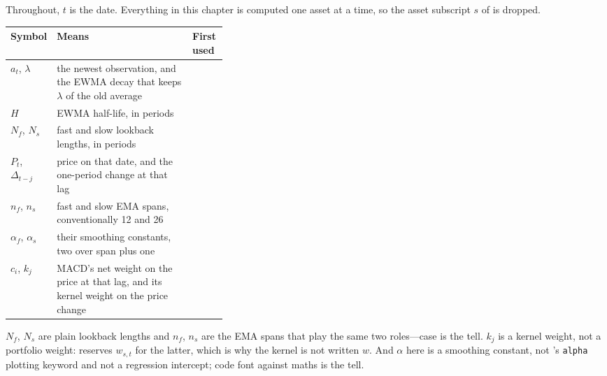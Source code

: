 Throughout, $t$ is the date. Everything in this chapter is computed one asset at a time, so the
asset subscript $s$ of  is dropped.

\begin{xltabular}{\linewidth}{|>{\raggedright\arraybackslash}p{0.20\linewidth}|X|>{\raggedright\arraybackslash}p{0.16\linewidth}|}
\hline
\textbf{Symbol} & \textbf{Means} & \textbf{First used} \\ \hline
\endhead
$a_t$, $\lambda$
  & the newest observation, and the EWMA decay that keeps $\lambda$ of the old average
  &  \\ \hline
$H$
  & EWMA half-life, in periods
  &  \\ \hline
$N_f$, $N_s$
  & fast and slow lookback lengths, in periods
  &  \\ \hline
$P_t$, $\Delta_{t-j}$
  & price on that date, and the one-period change at that lag
  &  \\ \hline
$n_f$, $n_s$
  & fast and slow EMA spans, conventionally 12 and 26
  &  \\ \hline
$\alpha_f$, $\alpha_s$
  & their smoothing constants, two over span plus one
  &  \\ \hline
$c_i$, $k_j$
  & MACD's net weight on the price at that lag, and its kernel weight on the price change
  &  \\ \hline
\end{xltabular}

\begin{note}
$N_f$, $N_s$ are plain lookback lengths and $n_f$, $n_s$ are the EMA spans that play the same two
roles---case is the tell. $k_j$ is a kernel weight, not a portfolio weight:
 reserves $w_{s,t}$ for the latter, which is why the kernel is not
written $w$. And $\alpha$ here is a smoothing constant, not
's \texttt{alpha} plotting keyword and not a regression
intercept; code font against maths is the tell.
\end{note}

